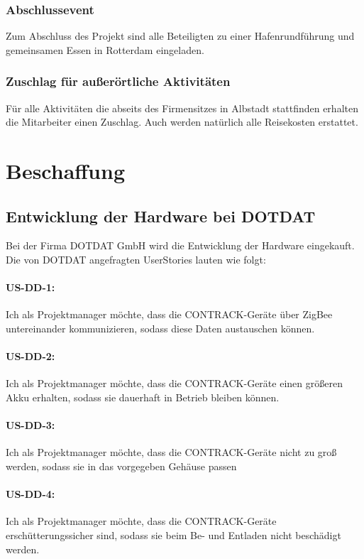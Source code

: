 \subsubsection{Abschlussevent} Zum Abschluss des Projekt sind alle Beteiligten zu einer Hafenrundführung und gemeinsamen Essen in Rotterdam eingeladen.
\subsubsection{Zuschlag für außerörtliche Aktivitäten} Für alle Aktivitäten die abseits des Firmensitzes in Albstadt stattfinden erhalten die Mitarbeiter einen Zuschlag. Auch werden natürlich alle Reisekosten erstattet.


\section{Beschaffung} %
\subsection{Entwicklung der Hardware bei DOTDAT}
Bei der Firma DOTDAT GmbH wird die Entwicklung der Hardware eingekauft. Die von DOTDAT angefragten UserStories lauten wie folgt:

\paragraph{US-DD-1:} Ich als Projektmanager möchte, dass die CONTRACK-Geräte über ZigBee untereinander kommunizieren, sodass diese Daten austauschen können.
\paragraph{US-DD-2:} Ich als Projektmanager möchte, dass die CONTRACK-Geräte einen größeren Akku erhalten, sodass sie dauerhaft in Betrieb bleiben können.
\paragraph{US-DD-3:} Ich als Projektmanager möchte, dass die CONTRACK-Geräte nicht zu groß werden, sodass sie in das vorgegeben Gehäuse passen
\paragraph{US-DD-4:} Ich als Projektmanager möchte, dass die CONTRACK-Geräte erschütterungssicher sind, sodass sie beim Be- und Entladen nicht beschädigt werden.

